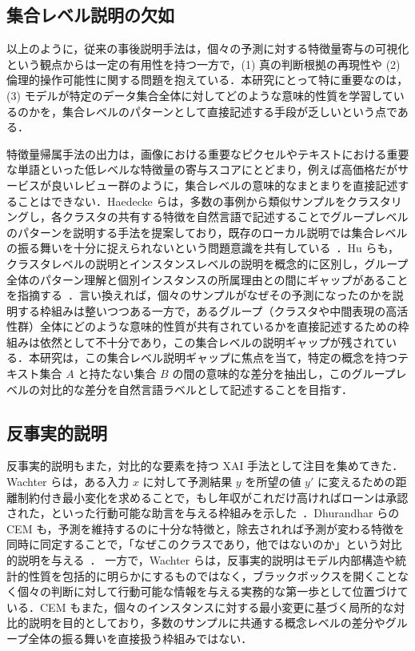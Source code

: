 \subsection{集合レベル説明の欠如}

以上のように，従来の事後説明手法は，個々の予測に対する特徴量寄与の可視化という観点からは一定の有用性を持つ一方で，(1) 真の判断根拠の再現性や (2) 倫理的操作可能性に関する問題を抱えている．本研究にとって特に重要なのは，(3) モデルが特定のデータ集合全体に対してどのような意味的性質を学習しているのかを，集合レベルのパターンとして直接記述する手段が乏しいという点である．

特徴量帰属手法の出力は，画像における重要なピクセルやテキストにおける重要な単語といった低レベルな特徴量の寄与スコアにとどまり，例えば高価格だがサービスが良いレビュー群のように，集合レベルの意味的なまとまりを直接記述することはできない．Haedecke らは，多数の事例から類似サンプルをクラスタリングし，各クラスタの共有する特徴を自然言語で記述することでグループレベルのパターンを説明する手法を提案しており，既存のローカル説明では集合レベルの振る舞いを十分に捉えられないという問題意識を共有している~\cite{haedecke2025conceptClusters}．Hu らも，クラスタレベルの説明とインスタンスレベルの説明を概念的に区別し，グループ全体のパターン理解と個別インスタンスの所属理由との間にギャップがあることを指摘する~\cite{hu2024interpretableClustering}．言い換えれば，個々のサンプルがなぜその予測になったのかを説明する枠組みは整いつつある一方で，あるグループ（クラスタや中間表現の高活性群）全体にどのような意味的性質が共有されているかを直接記述するための枠組みは依然として不十分であり，この集合レベルの説明ギャップが残されている．本研究は，この集合レベル説明ギャップに焦点を当て，特定の概念を持つテキスト集合 $A$ と持たない集合 $B$ の間の意味的な差分を抽出し，このグループレベルの対比的な差分を自然言語ラベルとして記述することを目指す．

\subsection{反事実的説明}

反事実的説明もまた，対比的な要素を持つ XAI 手法として注目を集めてきた．Wachter らは，ある入力 $x$ に対して予測結果 $y$ を所望の値 $y'$ に変えるための距離制約付き最小変化を求めることで，もし年収がこれだけ高ければローンは承認された，といった行動可能な助言を与える枠組みを示した~\cite{wachter2017counterfactual}．Dhurandhar らの CEM も，予測を維持するのに十分な特徴と，除去されれば予測が変わる特徴を同時に同定することで，「なぜこのクラスであり，他ではないのか」という対比的説明を与える~\cite{dhurandhar2018cem}．
一方で，Wachter らは，反事実的説明はモデル内部構造や統計的性質を包括的に明らかにするものではなく，ブラックボックスを開くことなく個々の判断に対して行動可能な情報を与える実務的な第一歩として位置づけている．CEM もまた，個々のインスタンスに対する最小変更に基づく局所的な対比的説明を目的としており，多数のサンプルに共通する概念レベルの差分やグループ全体の振る舞いを直接扱う枠組みではない．

